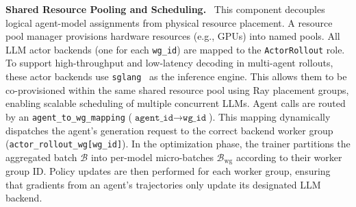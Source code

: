 \textbf{Shared Resource Pooling and Scheduling.}~
This component decouples logical agent-model assignments from physical resource placement. A resource pool manager provisions hardware resources (e.g., GPUs) into named pools. All LLM actor backends (one for each \texttt{wg\_id}) are mapped to the \texttt{ActorRollout} role. To support high-throughput and low-latency decoding in multi-agent rollouts, these actor backends use \texttt{sglang}~\citep{zheng2024sglang} as the inference engine. This allows them to be co-provisioned within the same shared resource pool using Ray placement groups, enabling scalable scheduling of multiple concurrent LLMs. Agent calls are routed by an \texttt{agent\_to\_wg\_mapping} ($\texttt{agent\_id} \rightarrow \texttt{wg\_id}$). This mapping dynamically dispatches the agent's generation request to the correct backend worker group (\texttt{actor\_rollout\_wg[wg\_id]}).
In the optimization phase, the trainer partitions the aggregated batch $\mathcal{B}$ into per-model micro-batches ${\mathcal{B}_{\text{wg}}}$ according to their worker group ID. Policy updates are then performed for each worker group, ensuring that gradients from an agent's trajectories only update its designated LLM backend.